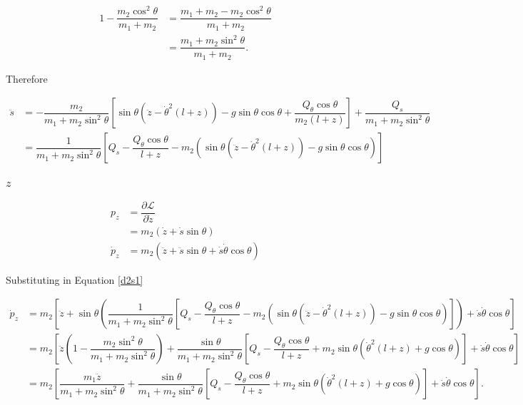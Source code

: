 \documentclass[12pt,a4paper,portrait]{article}
\newcommand{\lag}{\mathcal{L}}
\begin{document}
\begin{align*}
	1-\dfrac{m_2\cos^2{\theta}}{m_1+m_2} &= \dfrac{m_1+m_2 - m_2\cos^2{\theta}}{m_1+m_2} \\
	&= \dfrac{m_1+m_2\sin^2{\theta}}{m_1+m_2}.
\end{align*}

Therefore

\begin{align}
	\ddot{s} &= -\dfrac{m_2}{m_1+m_2\sin^2{\theta}}\left[\sin{\theta}(\ddot{z}-\dot{\theta}^2(l+z)) - g\sin{\theta}\cos{\theta} + \dfrac{Q_{\theta}\cos{\theta}}{m_2(l+z)}\right] + \dfrac{Q_s}{m_1+m_2\sin^2{\theta}} \nonumber\\
	&= \dfrac{1}{m_1+m_2\sin^2{\theta}}\left[Q_s - \dfrac{Q_{\theta}\cos{\theta}}{l+z} - m_2\left(\sin{\theta}(\ddot{z}-\dot{\theta}^2(l+z)) - g\sin{\theta}\cos{\theta}\right)\right] \label{d2s1}
\end{align}

\subsubsection{$z$}
\begin{align*}
	p_z &= \dfrac{\partial \lag}{\partial \dot{z}} \\
	&= m_2(\dot{z} + \dot{s}\sin{\theta}) \\
	\dot{p}_z &= m_2 (\ddot{z} + \ddot{s}\sin{\theta} + \dot{s}\dot{\theta}\cos{\theta})
\end{align*}

Substituting in Equation \eqref{d2s1}

\begin{align*}
	\dot{p}_z &= m_2 \left[\ddot{z} + \sin{\theta}\left(\dfrac{1}{m_1+m_2\sin^2{\theta}}\left[Q_s - \dfrac{Q_{\theta}\cos{\theta}}{l+z} - m_2\left(\sin{\theta}(\ddot{z}-\dot{\theta}^2(l+z)) - g\sin{\theta}\cos{\theta}\right)\right]\right) + \dot{s}\dot{\theta}\cos{\theta}\right]\\
	&= m_2 \left[\ddot{z}\left(1-\dfrac{m_2\sin^2{\theta}}{m_1+m_2\sin^2{\theta}}\right) + \dfrac{\sin{\theta}}{m_1+m_2\sin^2{\theta}}\left[Q_s - \dfrac{Q_{\theta}\cos{\theta}}{l+z} + m_2\sin{\theta}\left(\dot{\theta}^2(l+z) + g\cos{\theta}\right)\right] + \dot{s}\dot{\theta}\cos{\theta}\right] \\
	&=m_2 \left[\dfrac{m_1\ddot{z}}{m_1+m_2\sin^2{\theta}} + \dfrac{\sin{\theta}}{m_1+m_2\sin^2{\theta}}\left[Q_s - \dfrac{Q_{\theta}\cos{\theta}}{l+z} + m_2\sin{\theta}\left(\dot{\theta}^2(l+z) + g\cos{\theta}\right)\right] + \dot{s}\dot{\theta}\cos{\theta}\right].
\end{align*}
\end{document}
